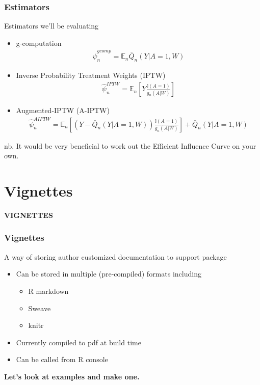 \documentclass{beamer}
\begin{document}
\begin{frame}
\frametitle{Estimators}
Estimators we'll be evaluating
\begin{itemize}
  \item g-computation
  \begin{gather*}
  	\hat{\psi}_n^{gcomp} = \mathbb{E}_n \bar{Q}_n(Y|A=1,W)
  \end{gather*}
  \item Inverse Probability Treatment Weights (IPTW)
  \begin{gather*}
  	\hat{\psi}_n^{IPTW} = \mathbb{E}_n \left[ Y \frac{\mathbb{I}(A=1)}{g_n(A|W)} \right]
  \end{gather*}
  \item Augmented-IPTW (A-IPTW)
  \begin{gather*}
  	\hat{\psi}_n^{AIPTW} = \mathbb{E}_n \left[ (Y - \bar{Q}_n(Y|A=1,W))\frac{\mathbb{I}(A=1)}{g_n(A|W)} \right] + \bar{Q}_n(Y|A=1,W)
  \end{gather*}
\end{itemize}

nb. It would be very beneficial to work out the Efficient Influence Curve on your own.
\end{frame}


\section{Vignettes}
\begin{frame}
\fontsize{18}{7.2}\selectfont
\centering
\textbf{VIGNETTES}
\end{frame}


\begin{frame}
\frametitle{Vignettes}
A way of storing author customized documentation to support package
\begin{itemize}
  \item Can be stored in multiple (pre-compiled) formats including
  \begin{itemize}
  	\item R markdown
	\item Sweave
	\item knitr
  \end{itemize}  
  \item Currently compiled to pdf at build time
  \item Can be called from R console
\end{itemize}
\bf Let's look at examples and make one.
\end{frame}
\end{document}
